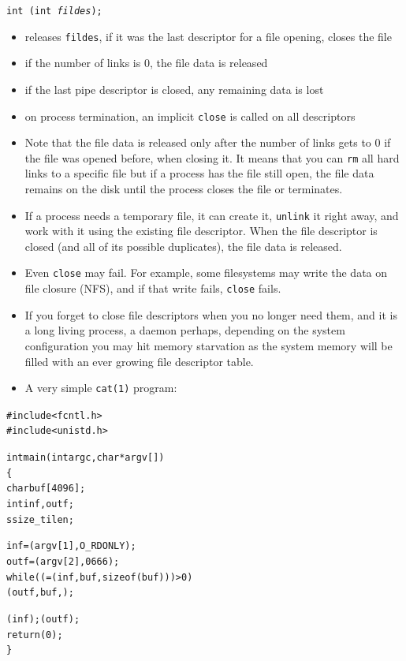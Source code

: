 

\begin{slide}
\texttt{int (int \emph{fildes});} 
\begin{itemize}
\item releases \texttt{fildes}, if it was the last descriptor for a file
opening, closes the file
\item if the number of links is 0, the file data is released
\item if the last pipe descriptor is closed, any remaining data is lost
\item on process termination, an implicit \texttt{close} is called on all
descriptors
\end{itemize}
\end{slide}

\begin{itemize}
\item Note that the file data is released only after the number of links gets to
0  if the file was opened before, when closing it.  It means that you
can \texttt{rm} all hard links to a specific file but if a process has the file
still open, the file data remains on the disk until the process closes the file
or terminates.
\item If a process needs a temporary file, it can create it, \texttt{unlink} it
right away, and work with it using the existing file descriptor.  When the file
descriptor is closed (and all of its possible duplicates), the file data is
released.
\item Even \texttt{close} may fail.  For example, some filesystems may write the
data on file closure (NFS), and if that write fails, \texttt{close} fails.
\item If you forget to close file descriptors when you no longer need them,
and it is a long living process, a daemon perhaps, depending on the system
configuration you may hit memory starvation as the system memory will be filled
with an ever growing file descriptor table.
\item \label{SIMPLE_CAT} A very simple \texttt{cat(1)} program:
\end{itemize}


\begin{slide}
\begin{alltt}
{\footnotesize
#include <fcntl.h>
#include <unistd.h>

int main(int argc, char *argv[])
\{
    char buf[4096];
    int inf, outf;
    ssize\_t ilen;

    inf = (argv[1], O\_RDONLY);
    outf = (argv[2], 0666);
    while (( = (inf, buf, sizeof (buf))) > 0)
            (outf, buf, );

    (inf); (outf);
    return (0);
\}
}
\end{alltt}
\end{slide}

